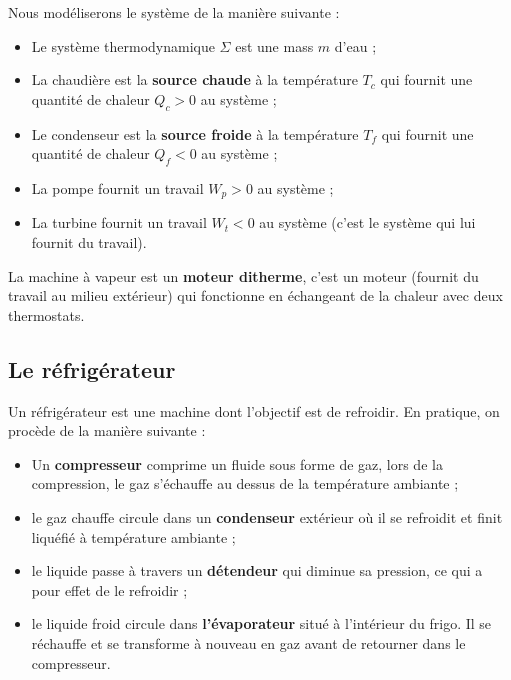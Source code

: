 \documentclass{cours}
\begin{document}
Nous modéliserons le système de la manière suivante : 
\begin{itemize}
  \item Le système thermodynamique $\Sigma$ est une mass $m$ d'eau ;
  \item La chaudière est la \textbf{source chaude} à la température $T_c$ qui fournit une quantité de chaleur $Q_c>0$ au système ;
  \item Le condenseur est la \textbf{source froide} à la température $T_f$ qui fournit une quantité de chaleur $Q_f<0$ au système ;
  \item La pompe fournit un travail $W_p>0$ au système ;
  \item La turbine fournit un travail $W_t<0$ au système (c'est le système qui lui fournit du travail).
\end{itemize}
\begin{minipage}{\linewidth}
\begin{center}
\end{center}
\end{minipage}
La machine à vapeur est un \textbf{moteur ditherme}, c'est un moteur (fournit du travail au milieu extérieur) qui fonctionne en échangeant de la chaleur avec deux thermostats. 

\subsection{Le réfrigérateur}%
\label{sub:le_refrigerateur}
Un réfrigérateur est une machine dont l'objectif est de refroidir. En pratique, on procède de la manière suivante :
\begin{itemize}
  \item Un \textbf{compresseur} comprime un fluide sous forme de gaz, lors de la compression, le gaz s'échauffe au dessus de la température ambiante ; 
  \item le gaz chauffe circule dans un \textbf{condenseur} extérieur où il se refroidit et finit liquéfié à température ambiante ;
  \item le liquide passe à travers un \textbf{détendeur} qui diminue sa pression, ce qui a pour effet de le refroidir ;
  \item le liquide froid circule dans \textbf{l'évaporateur} situé à l'intérieur du frigo. Il se réchauffe et se transforme à nouveau en gaz avant de retourner dans le compresseur.
\end{itemize}
\end{document}
